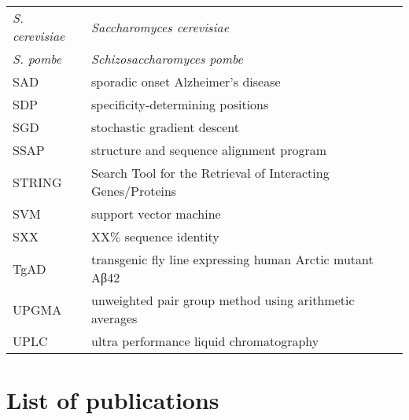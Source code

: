 \begin{longtable}{ll}
    \emph{S. cerevisiae} & \emph{Saccharomyces cerevisiae} \\
    \emph{S. pombe} & \emph{Schizosaccharomyces pombe} \\
    SAD & sporadic onset Alzheimer's disease \\
    SDP & specificity-determining positions \\
    SGD & stochastic gradient descent \\
    SSAP & structure and sequence alignment program \\
    STRING & Search Tool for the Retrieval of Interacting Genes/Proteins \\
    SVM & support vector machine \\
    SXX & XX$\%$ sequence identity \\
    TgAD & transgenic fly line expressing human Arctic mutant Aβ42 \\
    UPGMA & unweighted pair group method using arithmetic averages \\
    UPLC & ultra performance liquid chromatography \\
    \bottomrule
\end{longtable}

\chapter*{List of publications}

